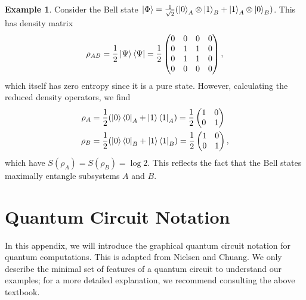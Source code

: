\documentclass[12pt,a4paper]{report}
\numberwithin{equation}{section}
\newcommand{\ketbra}[2]{\ket{#1}\bra{#2}}
\newcommand{\ketbras}[1]{\ketbra{#1}{#1}}
\theoremstyle{definition}
\theoremstyle{theorem}
\theoremstyle{theorem}
\theoremstyle{example}
\newtheorem{example}{Example}[section]
\theoremstyle{definition}
\begin{document}
\begin{example}
	Consider the Bell state $\ket{\Phi}=\frac{1}{\sqrt{2}}(\ket{0}_{A}\otimes\ket{1}_{B}+\ket{1}_{A}\otimes\ket{0}_{B})$. This has density matrix
	\begin{equation}
		\rho_{AB}=\frac{1}{2}\ketbras{\Psi}=\frac{1}{2}\begin{pmatrix}
			0&0&0&0\\0&1&1&0\\0&1&1&0\\0&0&0&0
		\end{pmatrix},
	\end{equation}
	which itself has zero entropy since it is a pure state. However, calculating the reduced density operators, we find
	\begin{equation}
			\begin{aligned}
			\rho_{A}&=\frac{1}{2}(\ketbras{0}_{A}+\ketbras{1}_{A})=\frac{1}{2}\begin{pmatrix}
				1&0\\0&1
			\end{pmatrix}\\\rho_{B}&=\frac{1}{2}(\ketbras{0}_{B}+\ketbras{1}_{B})=\frac{1}{2}\begin{pmatrix}
			1&0\\0&1
			\end{pmatrix},
		\end{aligned}
	\end{equation}
	 which have $S(\rho_{A})=S(\rho_{B})=\log{2}$. This reflects the fact that the Bell states maximally entangle subsystems $A$ and $B$.
\end{example}

\chapter{Quantum Circuit Notation}
In this appendix, we will introduce the graphical quantum circuit notation for quantum computations. This is adapted from Nielsen and Chuang\cite{NielsenChuang}. We only describe the minimal set of features of a quantum circuit to understand our examples; for a more detailed explanation, we recommend consulting the above textbook.
\end{document}
